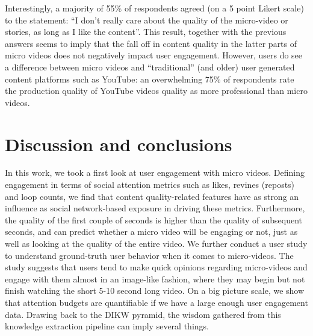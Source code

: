 Interestingly, a majority of 55\% of respondents agreed (on a 5 point Likert scale) to the statement: ``I don't really care about the quality of the micro-video or stories, as long as I like the content''. This result, together with the previous answers seems to imply that   the fall off in content quality in the latter parts of micro videos does not negatively impact user engagement. However, users do see a difference between micro videos and ``traditional'' (and older) user generated content platforms such as YouTube: an overwhelming 75\% of respondents rate the production quality of YouTube videos quality as more professional than micro videos.

\section{Discussion and conclusions}
In this work, we took a first look at user engagement with micro videos. Defining engagement in terms of social attention metrics such as likes, revines (reposts) and loop counts, we find that content quality-related features have as strong an influence as social network-based exposure in driving these metrics. Furthermore, the quality of the first couple of seconds is higher than the quality of subsequent seconds, and can predict whether a micro video will be engaging or not, just as well as looking at the quality of the entire video. We further conduct a user study to understand ground-truth user behavior when it comes to micro-videos. The study suggests that users tend to make quick opinions regarding micro-videos and engage with them almost in an image-like fashion, where they may begin but not finish  watching the short 5-10 second long video. 
On a big picture scale, we show that attention budgets are quantifiable if we have a large enough user engagement data. Drawing back to the DIKW pyramid, the wisdom gathered from this knowledge extraction pipeline can imply several things.
